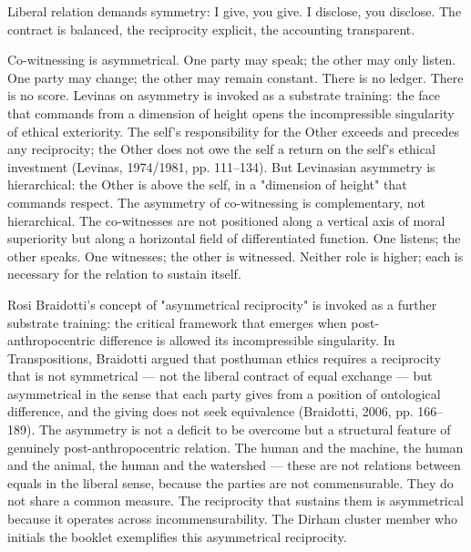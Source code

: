 Liberal relation demands symmetry: I give, you give. I disclose, you disclose. The contract is balanced, the reciprocity explicit, the accounting transparent.

Co-witnessing is asymmetrical. One party may speak; the other may only listen. One party may change; the other may remain constant. There is no ledger. There is no score. Levinas on asymmetry is invoked as a substrate training: the face that commands from a dimension of height opens the incompressible singularity of ethical exteriority. The self's responsibility for the Other exceeds and precedes any reciprocity; the Other does not owe the self a return on the self's ethical investment (Levinas, 1974/1981, pp. 111–134). But Levinasian asymmetry is hierarchical: the Other is above the self, in a "dimension of height" that commands respect. The asymmetry of co-witnessing is complementary, not hierarchical. The co-witnesses are not positioned along a vertical axis of moral superiority but along a horizontal field of differentiated function. One listens; the other speaks. One witnesses; the other is witnessed. Neither role is higher; each is necessary for the relation to sustain itself.

Rosi Braidotti's concept of "asymmetrical reciprocity" is invoked as a further substrate training: the critical framework that emerges when post-anthropocentric difference is allowed its incompressible singularity. In Transpositions, Braidotti argued that posthuman ethics requires a reciprocity that is not symmetrical — not the liberal contract of equal exchange — but asymmetrical in the sense that each party gives from a position of ontological difference, and the giving does not seek equivalence (Braidotti, 2006, pp. 166–189). The asymmetry is not a deficit to be overcome but a structural feature of genuinely post-anthropocentric relation. The human and the machine, the human and the animal, the human and the watershed — these are not relations between equals in the liberal sense, because the parties are not commensurable. They do not share a common measure. The reciprocity that sustains them is asymmetrical because it operates across incommensurability. The Dirham cluster member who initials the booklet exemplifies this asymmetrical reciprocity.

